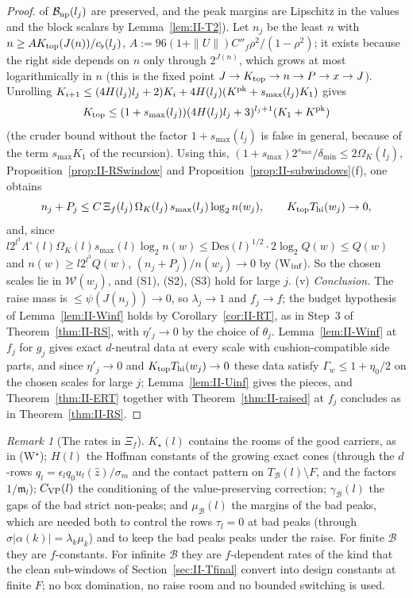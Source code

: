 \documentclass[10pt]{amsart}
\theoremstyle{definition}
\theoremstyle{remark}
\newtheorem{remark}[theorem]{Remark}
\newcommand{\zh}{\hat z}
\begin{document}
\begin{proof}
of $\mathcal B_{\rm np}(l_j)$ are preserved, and the peak margins are
Lipschitz in the values and the block scalars by Lemma~\ref{lem:II-T2}).
Let $n_j$ be the least $n$ with $n\ge AK_{\rm top}(J(n))/c_\flat(l_j)$,
$A:=96(1+\|U\|)C''_f\rho^2/(1-\rho^2)$; it exists because the right side
depends on $n$ only through $2^{J(n)}$, which grows at most logarithmically
in $n$ (this is the fixed point $J\to K_{\rm top}\to n\to P\to x\to J$).
Unrolling $K_{i+1}\le(4H(l_j)l_j+2)K_i+4H(l_j)(K^{\rm pk}+s_{\max}(l_j)K_1)$
gives
\[
 K_{\rm top}\le(1+s_{\max}(l_j))(4H(l_j)l_j+3)^{l_j+1}(K_1+K^{\rm pk})
\]
(the cruder bound without the factor $1+s_{\max}(l_j)$ is false in general,
because of the term $s_{\max}K_1$ of the recursion).  Using this,
$(1+s_{\max})2^{s_{\max}}/\delta_{\min}\le2\Omega_K(l_j)$, Proposition~\ref{prop:II-RSwindow}
and Proposition~\ref{prop:II-subwindows}(f), one obtains
\[
 n_j+P_j\le C\,\Xi_f(l_j)\,\Omega_K(l_j)\,s_{\max}(l_j)\log_2 n(w_j),\qquad
 K_{\rm top}T_{\rm hi}(w_j)\to0,
\]
and, since $l2^{l^3}\Lambda^\circ(l)\Omega_K(l)s_{\max}(l)\log_2n(w)\le
\mathrm{Des}(l)^{1/2}\cdot2\log_2Q(w)\le Q(w)$ and $n(w)\ge l2^{l^3}Q(w)$,
$(n_j+P_j)/n(w_j)\to0$ by (W$_{\rm inf}$).  So the chosen scales lie in
$\mathcal W(w_j)$, and (S1), (S2), (S3) hold for large $j$.
(v) \emph{Conclusion.}  The raise mass is $\le\psi(J(n_j))\to0$, so
$\lambda_j\to1$ and $f_j\to f$; the budget hypothesis of Lemma~\ref{lem:II-Winf}
holds by Corollary~\ref{cor:II-RT}, as in Step~3 of
Theorem~\ref{thm:II-RS}, with $\eta'_j\to0$ by the choice of $\theta_j$.
Lemma~\ref{lem:II-Winf} at $f_j$ for $g_j$ gives exact
$d$-neutral data at every scale with cushion-compatible side parts, and since
$\eta'_j\to0$ and $K_{\rm top}T_{\rm hi}(w_j)\to0$ these data satisfy
$\Gamma_w\le1+\eta_0/2$ on the chosen scales for large $j$;
Lemma~\ref{lem:II-Uinf} gives the pieces, and Theorem~\ref{thm:II-ERT} together
with Theorem~\ref{thm:II-raised} at $f_j$ concludes as in
Theorem~\ref{thm:II-RS}.
\end{proof}

\begin{remark}[The rates in $\Xi_f$]\label{rem:II-RSinf}
$K_\star(l)$ contains the rooms of the good carriers, as in (W$^\star$);
$H(l)$ the Hoffman constants of the growing exact cones (through the
$d$-rows $q_l=\epsilon_lq_0u_l(\zh)/\sigma_m$ and the contact pattern
on $T_{\mathcal B}(l)\setminus F$, and the factors $1/\mathfrak m_l$);
$C_{\rm VP}(l)$ the conditioning of the value-preserving correction;
$\gamma_{\mathcal B}(l)$ the gaps of the bad strict non-peaks; and
$\mu_{\mathcal B}(l)$ the margins of the bad peaks, which are needed both to
control the rows $\tau_l=0$ at bad peaks (through $\sigma|\alpha(k)|=
\lambda_k\mu_k$) and to keep the bad peaks peaks under the raise.  For
finite $\mathcal B$ they are $f$-constants.  For infinite $\mathcal B$ they
are $f$-dependent rates of the kind that the clean sub-windows of
Section~\ref{sec:II-Tfinal} convert into design constants at finite $F$; no
box domination, no raise room and no bounded switching is used.
\end{remark}
\end{document}
